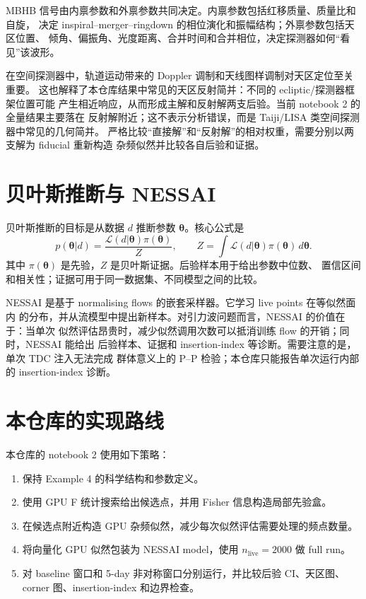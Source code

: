 \documentclass[11pt,a4paper]{ctexart}
\begin{document}
MBHB 信号由内禀参数和外禀参数共同决定。内禀参数包括红移质量、质量比和自旋，
决定 inspiral--merger--ringdown 的相位演化和振幅结构；外禀参数包括天区位置、
倾角、偏振角、光度距离、合并时间和合并相位，决定探测器如何“看见”该波形。

在空间探测器中，轨道运动带来的 Doppler 调制和天线图样调制对天区定位至关重要。
这也解释了本仓库结果中常见的天区反射简并：不同的 ecliptic/探测器框架位置可能
产生相近响应，从而形成主解和反射解两支后验。当前 notebook 2 的全量结果主要落在
反射解附近；这不表示分析错误，而是 Taiji/LISA 类空间探测器中常见的几何简并。
严格比较“直接解”和“反射解”的相对权重，需要分别以两支解为 fiducial 重新构造
杂频似然并比较各自后验和证据。

\section{贝叶斯推断与 NESSAI}

贝叶斯推断的目标是从数据 \(d\) 推断参数 \(\bm{\theta}\)。核心公式是
\[
  p(\bm{\theta}|d)
  = \frac{\mathcal{L}(d|\bm{\theta})\pi(\bm{\theta})}{Z},
  \qquad
  Z = \int \mathcal{L}(d|\bm{\theta})\pi(\bm{\theta})\,d\bm{\theta}.
\]
其中 \(\pi(\bm{\theta})\) 是先验，\(Z\) 是贝叶斯证据。后验样本用于给出参数中位数、
置信区间和相关性；证据可用于同一数据集、不同模型之间的比较。

NESSAI 是基于 normalising flows 的嵌套采样器。它学习 live points 在等似然面内
的分布，并从流模型中提出新样本。对引力波问题而言，NESSAI 的价值在于：当单次
似然评估昂贵时，减少似然调用次数可以抵消训练 flow 的开销；同时，NESSAI 能给出
后验样本、证据和 insertion-index 等诊断。需要注意的是，单次 TDC 注入无法完成
群体意义上的 P--P 检验；本仓库只能报告单次运行内部的 insertion-index 诊断。

\section{本仓库的实现路线}

本仓库的 notebook 2 使用如下策略：
\begin{enumerate}
  \item 保持 Example 4 的科学结构和参数定义。
  \item 使用 GPU F 统计搜索给出候选点，并用 Fisher 信息构造局部先验盒。
  \item 在候选点附近构造 GPU 杂频似然，减少每次似然评估需要处理的频点数量。
  \item 将向量化 GPU 似然包装为 NESSAI model，使用 \(n_\mathrm{live}=2000\)
  做 full run。
  \item 对 baseline 窗口和 5-day 非对称窗口分别运行，并比较后验 CI、天区图、
  corner 图、insertion-index 和边界检查。
\end{enumerate}
\end{document}
